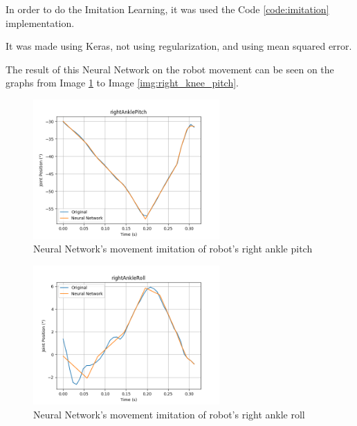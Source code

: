 \documentclass[journal]{IEEEtran}
\begin{document}
In order to do the Imitation Learning, it was used the Code \ref{code:imitation} implementation.

It was made using Keras, not using regularization, and using mean squared error.

The result of this Neural Network on the robot movement can be seen on the graphs from Image \ref{img:right_ankle_pitch} to Image \ref{img:right_knee_pitch}.

\begin{figure}
  \begin{center}
  \includegraphics[width=2.8in]{./../code/imitation_learning_result/rightAnklePitch.png}
  \caption{Neural Network's movement imitation of robot's right ankle pitch}
  \label{img:right_ankle_pitch}
  \end{center}
\end{figure}

\begin{figure}
  \begin{center}
  \includegraphics[width=2.8in]{./../code/imitation_learning_result/rightAnkleRoll.png}
  \caption{Neural Network's movement imitation of robot's right ankle roll}
  \label{img:right_ankle_roll}
  \end{center}
\end{figure}
\end{document}
